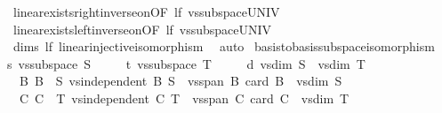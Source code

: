 \begin{isabellebody}
\ \ \ \ linear{\isacharunderscore}{\kern0pt}exists{\isacharunderscore}{\kern0pt}right{\isacharunderscore}{\kern0pt}inverse{\isacharunderscore}{\kern0pt}on{\isacharbrackleft}{\kern0pt}OF\ lf\ vs{}{\isachardot}{\kern0pt}subspace{\isacharunderscore}{\kern0pt}UNIV{\isacharbrackright}{\kern0pt}\isanewline
\ \ \ \ linear{\isacharunderscore}{\kern0pt}exists{\isacharunderscore}{\kern0pt}left{\isacharunderscore}{\kern0pt}inverse{\isacharunderscore}{\kern0pt}on{\isacharbrackleft}{\kern0pt}OF\ lf\ vs{}{\isachardot}{\kern0pt}subspace{\isacharunderscore}{\kern0pt}UNIV{\isacharbrackright}{\kern0pt}\isanewline
\ \ \ \ dims\ lf\ linear{\isacharunderscore}{\kern0pt}injective{\isacharunderscore}{\kern0pt}isomorphism\ \isamarkupfalse%
\ auto%
\endisatagproof
{\isafoldproof}%
%
\isadelimproof
\isanewline
%
\endisadelimproof
\isanewline
{}\isamarkupfalse%
\ basis{\isacharunderscore}{\kern0pt}to{\isacharunderscore}{\kern0pt}basis{\isacharunderscore}{\kern0pt}subspace{\isacharunderscore}{\kern0pt}isomorphism{\isacharcolon}{\kern0pt}\isanewline
\ \ \ s{\isacharcolon}{\kern0pt}\ {\isachardoublequoteopen}vs{}{\isachardot}{\kern0pt}subspace\ S{\isachardoublequoteclose}\isanewline
\ \ \ \ \ t{\isacharcolon}{\kern0pt}\ {\isachardoublequoteopen}vs{}{\isachardot}{\kern0pt}subspace\ T{\isachardoublequoteclose}\isanewline
\ \ \ \ \ d{\isacharcolon}{\kern0pt}\ {\isachardoublequoteopen}vs{}{\isachardot}{\kern0pt}dim\ S\ {\isacharequal}{\kern0pt}\ vs{}{\isachardot}{\kern0pt}dim\ T{\isachardoublequoteclose}\isanewline
\ \ \ \ \ B{\isacharcolon}{\kern0pt}\ {\isachardoublequoteopen}B\ {\isasymsubseteq}\ S{\isachardoublequoteclose}\ {\isachardoublequoteopen}vs{}{\isachardot}{\kern0pt}independent\ B{\isachardoublequoteclose}\ {\isachardoublequoteopen}S\ {\isasymsubseteq}\ vs{}{\isachardot}{\kern0pt}span\ B{\isachardoublequoteclose}\ {\isachardoublequoteopen}card\ B\ {\isacharequal}{\kern0pt}\ vs{}{\isachardot}{\kern0pt}dim\ S{\isachardoublequoteclose}\isanewline
\ \ \ \ \ C{\isacharcolon}{\kern0pt}\ {\isachardoublequoteopen}C\ {\isasymsubseteq}\ T{\isachardoublequoteclose}\ {\isachardoublequoteopen}vs{}{\isachardot}{\kern0pt}independent\ C{\isachardoublequoteclose}\ {\isachardoublequoteopen}T\ {\isasymsubseteq}\ vs{}{\isachardot}{\kern0pt}span\ C{\isachardoublequoteclose}\ {\isachardoublequoteopen}card\ C\ {\isacharequal}{\kern0pt}\ vs{}{\isachardot}{\kern0pt}dim\ T{\isachardoublequoteclose}\isanewline

\end{isabellebody}
